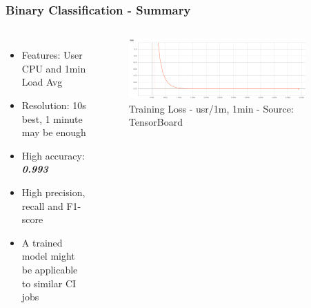 \documentclass[aspectratio=169,11pt,hyperref={colorlinks=true}]{beamer}
\begin{document}
\begin{frame}
    \frametitle{Binary Classification - Summary}
    \begin{columns}
        \begin{itemize}
            \item{Features: User CPU and 1min Load Avg}
            \item{Resolution: 10s best, 1 minute may be enough}
            \item{High accuracy: \emph{\textbf{0.993}}}
            \item{High precision, recall and F1-score}
            \item{A trained model might be applicable to similar CI jobs}
        \end{itemize}
        \begin{figure}
          \begin{center}
            \includegraphics[width=0.9\textwidth,height=0.5\textheight]{graphs/cpu_1m-1min-status_loss_curve.png}
              \caption{Training Loss - usr/1m, 1min - Source: TensorBoard}
          \end{center}
        \end{figure}
      \end{columns}
\end{frame}
\end{document}
